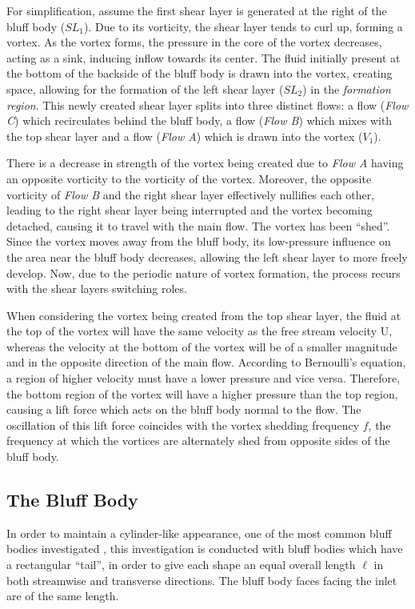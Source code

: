 For simplification, assume the first shear layer is generated at the right of the bluff body ($SL_{1}$). Due to its vorticity, the shear layer tends to curl up, forming a vortex. As the vortex forms, the pressure in the core of the vortex decreases, acting as a sink, inducing inflow towards its center. The fluid initially present at the bottom of the backside of the bluff body is drawn into the vortex, creating space, allowing for the formation of the left shear layer ($SL_{2}$) in the \textit{formation region}. This newly created shear layer splits into three distinct flows: a flow (\textit{Flow C}) which recirculates behind the bluff body, a flow (\textit{Flow B}) which mixes with the top shear layer and a flow (\textit{Flow A}) which is drawn into the vortex ($V_{1}$).

There is a decrease in strength of the vortex being created due to \textit{Flow A} having an opposite vorticity to the vorticity of the vortex. Moreover, the opposite vorticity of \textit{Flow B} and the right shear layer effectively nullifies each other, leading to the right shear layer being interrupted and the vortex becoming detached, causing it to travel with the main flow. The vortex has been “shed”. Since the vortex moves away from the bluff body, its low-pressure influence on the area near the bluff body decreases, allowing the left shear layer to more freely develop. Now, due to the periodic nature of vortex formation, the process recurs with the shear layers switching roles. 

When considering the vortex being created from the top shear layer, the fluid at the top of the vortex will have the same velocity as the free stream velocity U, whereas the velocity at the bottom of the vortex will be of a smaller magnitude and in the opposite direction of the main flow. According to Bernoulli’s equation, a region of higher velocity must have a lower pressure and vice versa. Therefore, the bottom region of the vortex will have a higher pressure than the top region, causing a lift force which acts on the bluff body normal to the flow. The oscillation of this lift force coincides with the vortex shedding frequency $f$, the frequency at which the vortices are alternately shed from opposite sides of the bluff body. 

\subsection{The Bluff Body}
\label{sec:bluffBody}
In order to maintain a cylinder-like appearance, one of the most common bluff bodies investigated \parencite[475]{rocchi2002_vortex}, this investigation is conducted with bluff bodies which have a rectangular “tail”, in order to give each shape an equal overall length $\ell$ in both streamwise and transverse directions. The bluff body faces facing the inlet are of the same length. 

